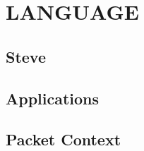 \chapter{LANGUAGE}
\label{language}

\section{Steve}
\label{language:steve}

\section{Applications}
\label{language:apps}

\section{Packet Context}
\label{language:cxt}

